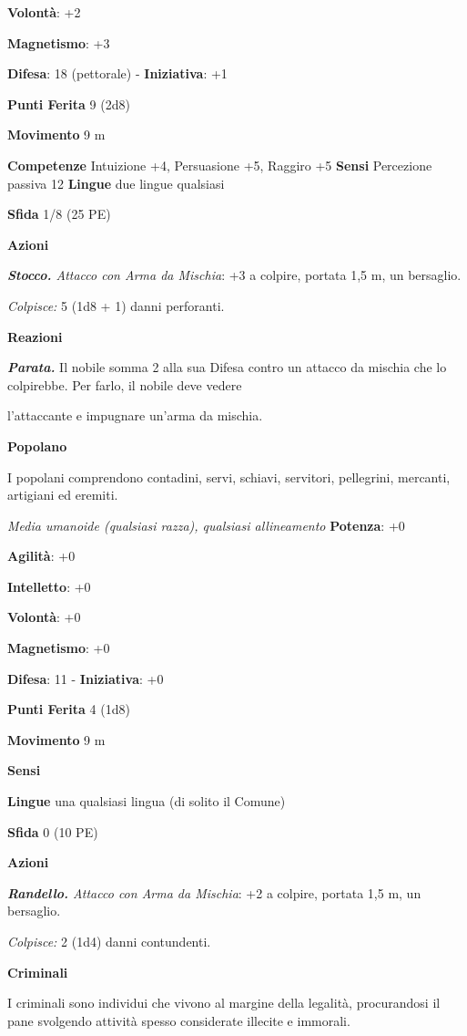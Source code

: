 \begin{multicols}{2}
\textbf{Volontà}: +2

\textbf{Magnetismo}: +3

\textbf{Difesa}: 18 (pettorale) - \textbf{Iniziativa}: +1

\textbf{Punti Ferita} 9 (2d8)

\textbf{Movimento} 9 m

\textbf{Competenze} Intuizione +4, Persuasione +5, Raggiro +5
\textbf{Sensi} Percezione passiva 12 \textbf{Lingue} due lingue
qualsiasi

\textbf{Sfida} 1/8 (25 PE)

\textbf{Azioni}

\emph{\textbf{Stocco.} Attacco con Arma da Mischia}: +3 a colpire,
portata 1,5 m, un bersaglio.

\emph{Colpisce:} 5 (1d8 + 1) danni perforanti.

\textbf{Reazioni}

\emph{\textbf{Parata.}} Il nobile somma 2 alla sua Difesa contro un attacco
da mischia che lo colpirebbe. Per farlo, il nobile deve vedere

l'attaccante e impugnare un'arma da mischia.

\textbf{Popolano}

I popolani comprendono contadini, servi, schiavi, servitori, pellegrini,
mercanti, artigiani ed eremiti.

\emph{Media umanoide (qualsiasi razza), qualsiasi allineamento}
\textbf{Potenza}: +0

\textbf{Agilità}: +0

\textbf{Intelletto}: +0

\textbf{Volontà}: +0

\textbf{Magnetismo}: +0

\textbf{Difesa}: 11 - \textbf{Iniziativa}: +0

\textbf{Punti Ferita} 4 (1d8)

\textbf{Movimento} 9 m

\textbf{Sensi} 

\textbf{Lingue} una qualsiasi lingua (di solito il Comune)

\textbf{Sfida} 0 (10 PE)

\textbf{Azioni}

\emph{\textbf{Randello.} Attacco con Arma da Mischia}: +2 a colpire,
portata 1,5 m, un bersaglio.

\emph{Colpisce:} 2 (1d4) danni contundenti.

\textbf{Criminali}

I criminali sono individui che vivono al margine della legalità,
procurandosi il pane svolgendo attività spesso considerate illecite e
immorali.


\end{multicols}
